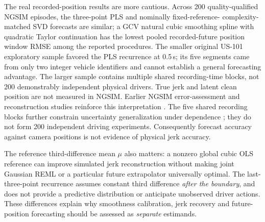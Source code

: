 The real recorded-position results are more cautious.
Across 200 quality-qualified NGSIM episodes,
the three-point PLS and nominally fixed-reference-
complexity-matched SVD forecasts are similar; a GCV natural cubic
smoothing spline with quadratic Taylor continuation
has the lowest pooled recorded-future position window RMSE
among the reported procedures. The smaller original
US-101 exploratory sample favored the PLS
recurrence at 0.5\,s; its five segments came
from only two integer vehicle identifiers and
cannot establish a general forecasting advantage.
The larger sample contains multiple shared
recording-time blocks, not 200 demonstrably
independent physical drivers. True jerk and
latent clean position are not measured in NGSIM.
Earlier NGSIM error-assessment and reconstruction studies
reinforce this interpretation
\citep{punzo2011,montanino2013,coifman2017,
montanino2015,zhang2024ngsim}.
The five shared recording blocks further constrain
uncertainty generalization under dependence
\citep{cameronmiller2015}; they do not form
200 independent driving experiments.
Consequently forecast accuracy against camera
positions is not evidence of physical jerk accuracy.

The reference third-difference mean $\mu$ also
matters: a nonzero global cubic OLS reference
can improve simulated jerk reconstruction without
making joint Gaussian REML or a particular
future extrapolator universally optimal. The
last-three-point recurrence assumes constant
third difference \emph{after the boundary}, and
does not provide a predictive distribution
or anticipate unobserved driver actions.
These differences explain why smoothness
calibration, jerk recovery and future-position
forecasting should be assessed as
\emph{separate} estimands.

